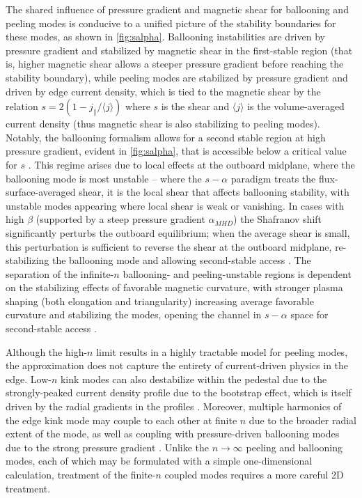 The shared influence of pressure gradient and magnetic shear for ballooning and peeling modes is conducive to a unified picture of the stability boundaries for these modes, as shown in \cref{fig:salpha}.  Ballooning instabilities are driven by pressure gradient and stabilized by magnetic shear in the first-stable region (that is, higher magnetic shear allows a steeper pressure gradient before reaching the stability boundary), while peeling modes are stabilized by pressure gradient and driven by edge current density, which is tied to the magnetic shear by the relation $s = 2(1 - j_\parallel/\langle j \rangle)$ where $s$ is the shear and $\langle j \rangle$ is the volume-averaged current density \cite{Connor1978} (thus magnetic shear is also stabilizing to peeling modes).  Notably, the ballooning formalism allows for a second stable region at high pressure gradient, evident in \cref{fig:salpha}, that is accessible below a critical value for $s$ \cite{Miller1998,Connor1998,Wilson1999}.  This regime arises due to local effects at the outboard midplane, where the ballooning mode is most unstable -- where the $s-\alpha$ paradigm treats the flux-surface-averaged shear, it is the local shear that affects ballooning stability, with unstable modes appearing where local shear is weak or vanishing.  In cases with high $\beta$ (supported by a steep pressure gradient $\alpha_{MHD}$) the Shafranov shift significantly perturbs the outboard equilibrium; when the average shear is small, this perturbation is sufficient to reverse the shear at the outboard midplane, re-stabilizing the ballooning mode and allowing second-stable access \cite{Greene1981}.  The separation of the infinite-$n$ ballooning- and peeling-unstable regions is dependent on the stabilizing effects of favorable magnetic curvature, with stronger plasma shaping (both elongation and triangularity) increasing average favorable curvature and stabilizing the modes, opening the channel in $s-\alpha$ space for second-stable access \cite{Snyder2002}.

Although the high-$n$ limit results in a highly tractable model for peeling modes, the approximation does not capture the entirety of current-driven physics in the edge.  Low-$n$ kink modes can also destabilize within the pedestal due to the strongly-peaked current density profile due to the bootstrap effect, which is itself driven by the radial gradients in the profiles \cite{Snyder2002}.  Moreover, multiple harmonics of the edge kink mode may couple to each other at finite $n$ due to the broader radial extent of the mode, as well as coupling with pressure-driven ballooning modes due to the strong pressure gradient \cite{Wilson1999,Snyder2004}.  Unlike the $n \rightarrow \infty$ peeling and ballooning modes, each of which may be formulated with a simple one-dimensional calculation, treatment of the finite-$n$ coupled modes requires a more careful 2D treatment.

